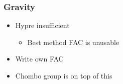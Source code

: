     \begin{frame}[fragile] \frametitle{Gravity}
      \begin{itemize}
        \item Hypre insufficient
        \begin{itemize}
          \item Best method FAC is unusable
        \end{itemize}
        \item Write own FAC
        \item Chombo group is on top of this
      \end{itemize}
\end{frame}
